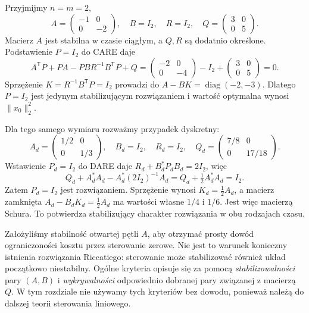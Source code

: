 \begin{przyklad}
\label{prz:lin24-two-states}
Przyjmijmy \(n=m=2\),
\[
 A=\begin{pmatrix}-1&0\\0&-2\end{pmatrix},
 \quad B=I_2,\quad
 R=I_2,\quad
 Q=\begin{pmatrix}3&0\\0&5\end{pmatrix}.
\]
Macierz \(A\) jest stabilna
w czasie ciągłym,
a \(Q,R\) są dodatnio określone.
Podstawienie \(P=I_2\)
do CARE daje
\[
 A^{\mathsf T}P+PA
 -PBR^{-1}B^{\mathsf T}P+Q
 =\begin{pmatrix}-2&0\\0&-4\end{pmatrix}
   -I_2+
  \begin{pmatrix}3&0\\0&5\end{pmatrix}
 =0.
\]
Sprzężenie \(K=R^{-1}B^{\mathsf T}P=I_2\)
prowadzi do
\(A-BK=\operatorname{diag}(-2,-3)\).
Dlatego \(P=I_2\)
jest jedynym stabilizującym
rozwiązaniem i wartość
optymalna wynosi
\(\|x_0\|_2^2\).

Dla tego samego wymiaru
rozważmy przypadek dyskretny:
\[
 A_d=\begin{pmatrix}1/2&0\\0&1/3\end{pmatrix},
 \quad B_d=I_2,\quad R_d=I_2,
 \quad Q_d=\begin{pmatrix}7/8&0\\0&17/18\end{pmatrix}.
\]
Wstawienie \(P_d=I_2\)
do DARE daje
\(R_d+B_d^*P_dB_d=2I_2\),
więc
\[
 Q_d+A_d^*A_d
 -A_d^*(2I_2)^{-1}A_d
 =Q_d+\tfrac12A_d^*A_d=I_2.
\]
Zatem \(P_d=I_2\)
jest rozwiązaniem.
Sprzężenie wynosi
\(K_d=\tfrac12 A_d\),
a macierz zamknięta
\(A_d-B_dK_d=\tfrac12A_d\)
ma wartości własne \(1/4\) i \(1/6\).
Jest więc macierzą Schura.
To potwierdza stabilizujący
charakter rozwiązania
w obu rodzajach czasu.
\end{przyklad}

\begin{uwaga}
\label{rem:lin24-limits}
Założyliśmy stabilność
otwartej pętli \(A\),
aby otrzymać prosty dowód
ograniczoności kosztu
przez sterowanie zerowe.
Nie jest to warunek konieczny
istnienia rozwiązania Riccatiego:
sterowanie może stabilizować
również układ początkowo niestabilny.
Ogólne kryteria opisuje się
za pomocą \emph{stabilizowalności}
pary \((A,B)\)
i \emph{wykrywalności}
odpowiednio dobranej pary
związanej z macierzą \(Q\).
W tym rozdziale nie używamy
tych kryteriów bez dowodu,
ponieważ należą do dalszej
teorii sterowania liniowego.
\end{uwaga}

